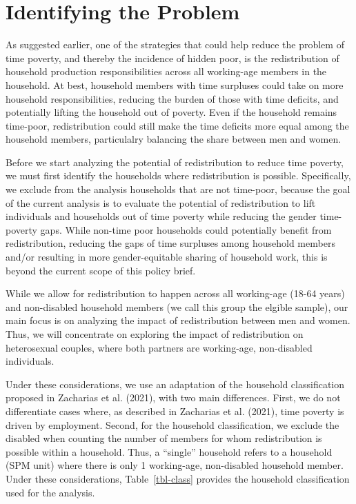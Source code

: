 \documentclass[
  11pt,
]{article}
\begin{document}
\section{Identifying the Problem}\label{sec-problem}

As suggested earlier, one of the strategies that could help reduce the
problem of time poverty, and thereby the incidence of hidden poor, is
the redistribution of household production responsibilities across all
working-age members in the household. At best, household members with
time surpluses could take on more household responsibilities, reducing
the burden of those with time deficits, and potentially lifting the
household out of poverty. Even if the household remains time-poor,
redistribution could still make the time deficits more equal among the
household members, particulalry balancing the share between men and
women.

Before we start analyzing the potential of redistribution to reduce time
poverty, we must first identify the households where redistribution is
possible. Specifically, we exclude from the analysis households that are
not time-poor, because the goal of the current analysis is to evaluate
the potential of redistribution to lift individuals and households out
of time poverty while reducing the gender time-poverty gaps. While
non-time poor households could potentially benefit from redistribution,
reducing the gaps of time surpluses among household members and/or
resulting in more gender-equitable sharing of household work, this is
beyond the current scope of this policy brief.

While we allow for redistribution to happen across all working-age
(18-64 years) and non-disabled household members (we call this group the
elgible sample), our main focus is on analyzing the impact of
redistribution between men and women. Thus, we will concentrate on
exploring the impact of redistribution on heterosexual couples, where
both partners are working-age, non-disabled individuals.

Under these considerations, we use an adaptation of the household
classification proposed in Zacharias et al. (2021), with two main
differences. First, we do not differentiate cases where, as described in
Zacharias et al. (2021), time poverty is driven by employment. Second,
for the household classification, we exclude the disabled when counting
the number of members for whom redistribution is possible within a
household. Thus, a ``single'' household refers to a household (SPM unit)
where there is only 1 working-age, non-disabled household member. Under
these considerations, Table~\ref{tbl-class} provides the household
classification used for the analysis.
\end{document}
